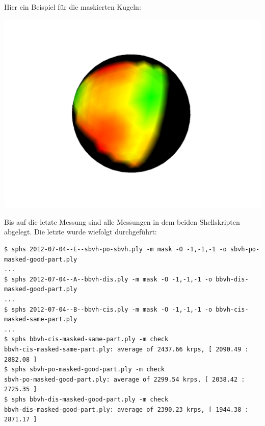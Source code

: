 \documentclass[a4paper,11pt]{article}
\begin{document}
\begin{itemize}
	Hier ein Beispiel für die maskierten Kugeln:
	\begin{center}
	\includegraphics[width=.45\textwidth]{2012-07-04/masked-sphere.png}\hfill
	\end{center}

\end{itemize}

Bis auf die letzte Messung sind alle Messungen in dem beiden Shellskripten abgelegt.
Die letzte wurde wiefolgt durchgeführt:

{\small
\begin{verbatim}
$ sphs 2012-07-04--E--sbvh-po-sbvh.ply -m mask -O -1,-1,-1 -o sbvh-po-masked-good-part.ply
...
$ sphs 2012-07-04--A--bbvh-dis.ply -m mask -O -1,-1,-1 -o bbvh-dis-masked-good-part.ply
...
$ sphs 2012-07-04--B--bbvh-cis.ply -m mask -O -1,-1,-1 -o bbvh-cis-masked-same-part.ply
...
$ sphs bbvh-cis-masked-same-part.ply -m check
bbvh-cis-masked-same-part.ply: average of 2437.66 krps, [ 2090.49 : 2882.08 ]
$ sphs sbvh-po-masked-good-part.ply -m check
sbvh-po-masked-good-part.ply: average of 2299.54 krps, [ 2038.42 : 2725.35 ]
$ sphs bbvh-dis-masked-good-part.ply -m check
bbvh-dis-masked-good-part.ply: average of 2390.23 krps, [ 1944.38 : 2871.17 ]
\end{verbatim}}
\end{document}
